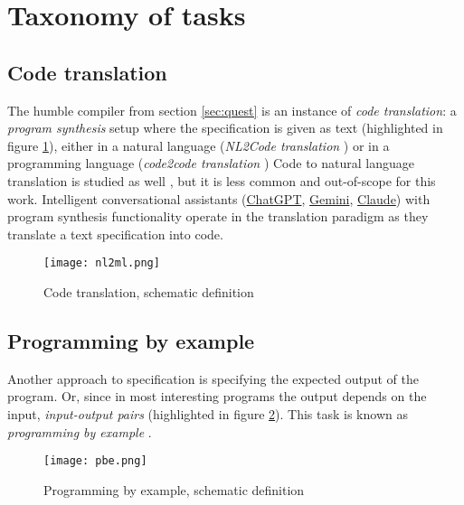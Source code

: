 
\newpage
\section{Taxonomy of tasks}
\label{sec:ps-task-taxonomy}

\subsection{Code translation}
\label{sec:code-translation}

The humble compiler from section \ref{sec:quest} is an instance of \emph{code translation}: a \emph{program synthesis} setup where the specification is given as text (highlighted in figure \ref{fig:nl2ml}), either in a natural language (\emph{NL2Code translation} \cite{wangNaturalLanguageCode2023, zanLargeLanguageModels2023}) or in a programming language (\emph{code2code translation} \cite{radfordImprovingLanguageUnderstanding})
Code to natural language translation is studied as well \cite[section 5.1]{leDeepLearningSource2020}, but it is less common and out-of-scope for this work.
Intelligent conversational assistants (\href{https://chat.openai.com/}{ChatGPT}, \href{https://gemini.google.com}{Gemini}, \href{https://claude.ai/}{Claude}) with program synthesis functionality operate in the translation paradigm as they translate a text specification into code.

\begin{figure}
    \centering
    \texttt{[image: nl2ml.png]}
    \caption{Code translation, schematic definition}
    \label{fig:nl2ml}
\end{figure}

\subsection{Programming by example}

Another approach to specification is specifying the expected output of the program. Or, since in most interesting programs the output depends on the input, \emph{input-output pairs} (highlighted in figure \ref{fig:pbe}). This task is known as \emph{programming by example} \cite{halbertProgrammingExample1984, psb2}.

\begin{figure}
    \centering
    \texttt{[image: pbe.png]}
    \caption{Programming by example, schematic definition}
    \label{fig:pbe}
\end{figure}

